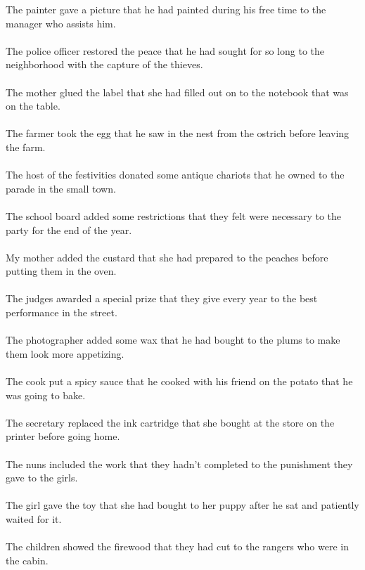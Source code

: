 The painter gave a picture that he had painted during his free time to the manager who assists him.	\\	\\
The police officer restored the peace that he had sought for so long to the neighborhood with the capture of the thieves.	\\	\\
The mother glued the label that she had filled out on to the notebook that was on the table.	\\	\\
The farmer took the egg that he saw in the nest from the ostrich before leaving the farm.	\\	\\
The host of the festivities donated some antique chariots that he owned to the parade in the small town.	\\	\\
The school board added some restrictions that they felt were necessary to the party for the end of the year.	\\	\\
My mother added the custard that she had prepared to the peaches before putting them in the oven.	\\	\\
The judges awarded a special prize that they give every year to the best performance in the street.	\\	\\
The photographer added some wax that he had bought to the plums to make them look more appetizing.	\\	\\
The cook put a spicy sauce that he cooked with his friend on the potato that he was going to bake.	\\	\\
The secretary replaced the ink cartridge that she bought at the store on the printer before going home.	\\	\\
The nuns included the work that they hadn't completed to the punishment they gave to the girls.	\\	\\
The girl gave the toy that she had bought to her puppy after he sat and patiently waited for it.	\\	\\
The children showed the firewood that they had cut to the rangers who were in the cabin.	\\	\\
